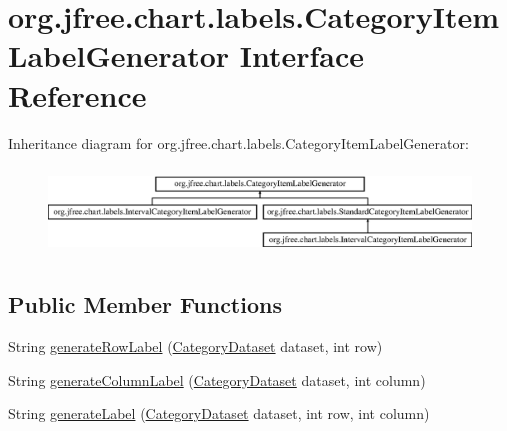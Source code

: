 \hypertarget{interfaceorg_1_1jfree_1_1chart_1_1labels_1_1_category_item_label_generator}{}\section{org.\+jfree.\+chart.\+labels.\+Category\+Item\+Label\+Generator Interface Reference}
\label{interfaceorg_1_1jfree_1_1chart_1_1labels_1_1_category_item_label_generator}
Inheritance diagram for org.\+jfree.\+chart.\+labels.\+Category\+Item\+Label\+Generator\+:\begin{figure}[H]
\begin{center}
\leavevmode
\includegraphics[height=2.359551cm]{interfaceorg_1_1jfree_1_1chart_1_1labels_1_1_category_item_label_generator}
\end{center}
\end{figure}
\subsection*{Public Member Functions}
\begin{DoxyCompactItemize}
\item 
String \mbox{\hyperlink{interfaceorg_1_1jfree_1_1chart_1_1labels_1_1_category_item_label_generator_af16f2beea92dee57d6de10f2248f2235}{generate\+Row\+Label}} (\mbox{\hyperlink{interfaceorg_1_1jfree_1_1data_1_1category_1_1_category_dataset}{Category\+Dataset}} dataset, int row)
\item 
String \mbox{\hyperlink{interfaceorg_1_1jfree_1_1chart_1_1labels_1_1_category_item_label_generator_a5c9725076b50f97656bcec07b4ac744e}{generate\+Column\+Label}} (\mbox{\hyperlink{interfaceorg_1_1jfree_1_1data_1_1category_1_1_category_dataset}{Category\+Dataset}} dataset, int column)
\item 
String \mbox{\hyperlink{interfaceorg_1_1jfree_1_1chart_1_1labels_1_1_category_item_label_generator_acae81c6066bec7b9a0761ca61fe6f626}{generate\+Label}} (\mbox{\hyperlink{interfaceorg_1_1jfree_1_1data_1_1category_1_1_category_dataset}{Category\+Dataset}} dataset, int row, int column)
\end{DoxyCompactItemize}


